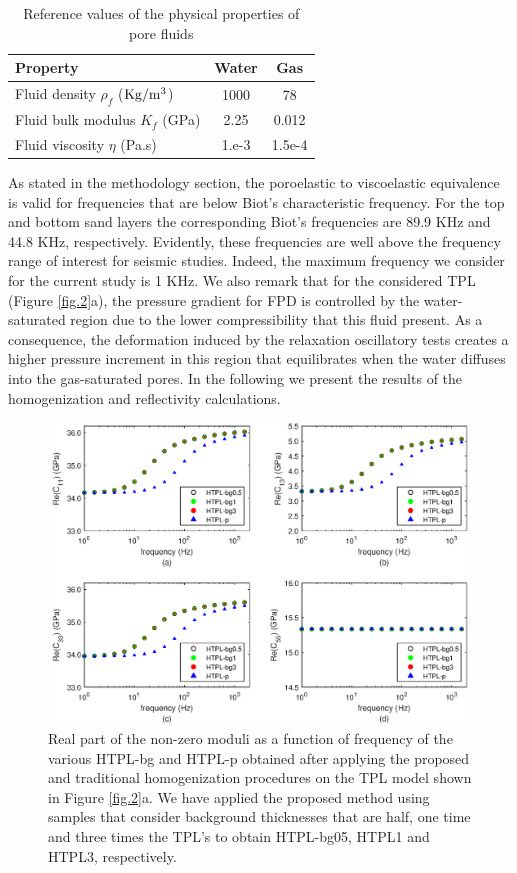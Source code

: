 \documentclass[draft]{agujournal2019}
\begin{document}
\begin{table}[!ht]
  \caption{Reference values of the physical properties of pore fluids}
\begin{center}
  \begin{tabular}{ | l | c | c |  }
    \hline
    Property & Water & Gas\\ \hline
    Fluid density $\rho_f$ ($\rm{Kg/m^3}$) & 1000 & 78\\
    Fluid bulk modulus $K_f$ (\rm{GPa}) & 2.25 & 0.012\\
    Fluid viscosity $\eta$ (\rm{Pa.s})& 1.e-3 & 1.5e-4\\
    \hline
  \end{tabular}
  \label{table.2}
\end{center}
\end{table}

As stated in the methodology section, the poroelastic to viscoelastic equivalence is valid for frequencies that are below Biot's characteristic frequency. For the top and bottom sand layers the corresponding Biot's frequencies are 89.9 KHz and 44.8 KHz, respectively. Evidently, these frequencies are well above the frequency range of interest for seismic studies. Indeed, the maximum frequency we consider for the current study is 1 KHz. 
We also remark that for the considered TPL (Figure \ref{fig.2}a), the pressure gradient for FPD is controlled by the water-saturated region due to the lower compressibility that this fluid present. As a consequence, the deformation induced by the relaxation oscillatory tests creates a higher pressure increment in this region that equilibrates when the water diffuses into the gas-saturated pores.
In the following we present the results of the homogenization and reflectivity calculations.
\begin{figure}[!ht]
\centering
        \includegraphics[width= 120mm, height=80mm]{cij_2sandshale.eps}
\caption{Real part of the non-zero moduli as a function of frequency of the various HTPL-bg and HTPL-p obtained after applying the proposed and traditional homogenization procedures on the TPL model shown in Figure \ref{fig.2}a. We have applied the proposed method using samples that consider background thicknesses that are half, one time and three times the TPL's to obtain HTPL-bg05, HTPL1 and HTPL3, respectively.}
\label{fig.3}
\end{figure}
\end{document}

